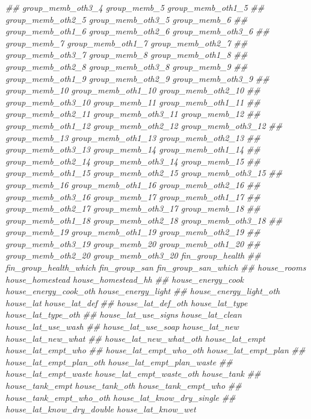 \documentclass[
]{article}
\newenvironment{Shaded}{\begin{snugshade}}{\end{snugshade}}
\newcommand{\CommentTok}[1]{\textcolor[rgb]{0.56,0.35,0.01}{\textit{#1}}}
\begin{document}
\begin{Shaded}
\begin{Highlighting}[]
\CommentTok{##      group_memb_oth3_4 group_memb_5 group_memb_oth1_5}
\CommentTok{##      group_memb_oth2_5 group_memb_oth3_5 group_memb_6}
\CommentTok{##      group_memb_oth1_6 group_memb_oth2_6 group_memb_oth3_6}
\CommentTok{##      group_memb_7 group_memb_oth1_7 group_memb_oth2_7}
\CommentTok{##      group_memb_oth3_7 group_memb_8 group_memb_oth1_8}
\CommentTok{##      group_memb_oth2_8 group_memb_oth3_8 group_memb_9}
\CommentTok{##      group_memb_oth1_9 group_memb_oth2_9 group_memb_oth3_9}
\CommentTok{##      group_memb_10 group_memb_oth1_10 group_memb_oth2_10}
\CommentTok{##      group_memb_oth3_10 group_memb_11 group_memb_oth1_11}
\CommentTok{##      group_memb_oth2_11 group_memb_oth3_11 group_memb_12}
\CommentTok{##      group_memb_oth1_12 group_memb_oth2_12 group_memb_oth3_12}
\CommentTok{##      group_memb_13 group_memb_oth1_13 group_memb_oth2_13}
\CommentTok{##      group_memb_oth3_13 group_memb_14 group_memb_oth1_14}
\CommentTok{##      group_memb_oth2_14 group_memb_oth3_14 group_memb_15}
\CommentTok{##      group_memb_oth1_15 group_memb_oth2_15 group_memb_oth3_15}
\CommentTok{##      group_memb_16 group_memb_oth1_16 group_memb_oth2_16}
\CommentTok{##      group_memb_oth3_16 group_memb_17 group_memb_oth1_17}
\CommentTok{##      group_memb_oth2_17 group_memb_oth3_17 group_memb_18}
\CommentTok{##      group_memb_oth1_18 group_memb_oth2_18 group_memb_oth3_18}
\CommentTok{##      group_memb_19 group_memb_oth1_19 group_memb_oth2_19}
\CommentTok{##      group_memb_oth3_19 group_memb_20 group_memb_oth1_20}
\CommentTok{##      group_memb_oth2_20 group_memb_oth3_20 fin_group_health}
\CommentTok{##      fin_group_health_which fin_group_san fin_group_san_which}
\CommentTok{##      house_rooms house_homestead house_homestead_hh}
\CommentTok{##      house_energy_cook house_energy_cook_oth house_energy_light}
\CommentTok{##      house_energy_light_oth house_lat house_lat_def}
\CommentTok{##      house_lat_def_oth house_lat_type house_lat_type_oth}
\CommentTok{##      house_lat_use_signs house_lat_clean house_lat_use_wash}
\CommentTok{##      house_lat_use_soap house_lat_new house_lat_new_what}
\CommentTok{##      house_lat_new_what_oth house_lat_empt house_lat_empt_who}
\CommentTok{##      house_lat_empt_who_oth house_lat_empt_plan}
\CommentTok{##      house_lat_empt_plan_oth house_lat_empt_plan_waste}
\CommentTok{##      house_lat_empt_waste house_lat_empt_waste_oth house_tank}
\CommentTok{##      house_tank_empt house_tank_oth house_tank_empt_who}
\CommentTok{##      house_tank_empt_who_oth house_lat_know_dry_single}
\CommentTok{##      house_lat_know_dry_double house_lat_know_wet}

\end{Highlighting}
\end{Shaded}
\end{document}
